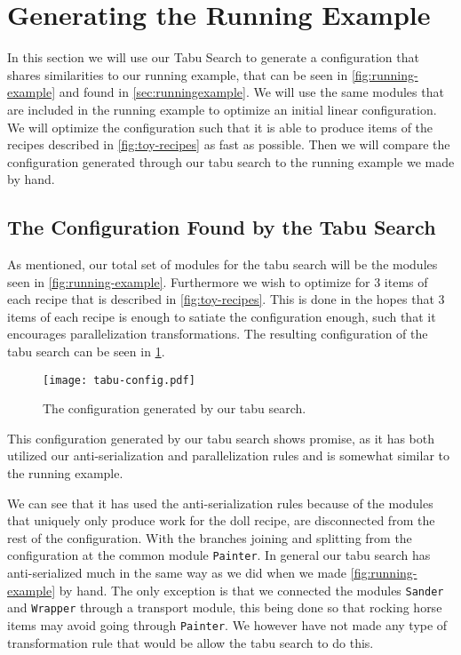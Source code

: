 \section{Generating the Running Example} \label{sec:exp-tabu}
In this section we will use our Tabu Search to generate a configuration that shares similarities to our running example, that can be seen in \cref{fig:running-example} and found in \cref{sec:runningexample}. We will use the same modules that are included in the running example to optimize an initial linear configuration. We will optimize the configuration such that it is able to produce items of the recipes described in \cref{fig:toy-recipes} as fast as possible. Then we will compare the configuration generated through our tabu search to the running example we made by hand.

\subsection{The Configuration Found by the Tabu Search}
As mentioned, our total set of modules for the tabu search will be the modules seen in \cref{fig:running-example}. Furthermore we wish to optimize for 3 items of each recipe that is described in \cref{fig:toy-recipes}. This is done in the hopes that 3 items of each recipe is enough to satiate the configuration enough, such that it encourages parallelization transformations. The resulting configuration of the tabu search can be seen in \cref{fig:tabu-config}.

\begin{figure}[H]
	\centering
	\texttt{[image: tabu-config.pdf]}
	\caption{The configuration generated by our tabu search.}
	\label{fig:tabu-config}
\end{figure}

This configuration generated by our tabu search shows promise, as it has both utilized our anti-serialization and parallelization rules and is somewhat similar to the running example. 

We can see that it has used the anti-serialization rules because of the modules that uniquely only produce work for the doll recipe, are disconnected from the rest of the configuration. With the branches joining and splitting from the configuration at the common module \texttt{Painter}. In general our tabu search has anti-serialized much in the same way as we did when we made \cref{fig:running-example} by hand. The only exception is that we connected the modules \texttt{Sander} and \texttt{Wrapper} through a transport module, this being done so that rocking horse items may avoid going through \texttt{Painter}. We however have not made any type of transformation rule that would be allow the tabu search to do this. 

